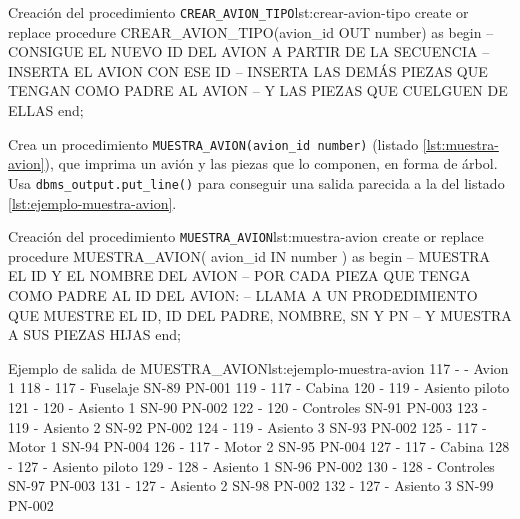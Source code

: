 \begin{homeworkProblem}
  \begin{listadosql}{Creación del procedimiento \texttt{CREAR\_AVION\_TIPO}}{lst:crear-avion-tipo}
create or replace procedure CREAR_AVION_TIPO(avion_id OUT number)
as 
begin
  -- CONSIGUE EL NUEVO ID DEL AVION A PARTIR DE LA SECUENCIA
  -- INSERTA EL AVION CON ESE ID
  -- INSERTA LAS DEMÁS PIEZAS QUE TENGAN COMO PADRE AL AVION
  --   Y LAS PIEZAS QUE CUELGUEN DE ELLAS
end;
\end{listadosql}


  Crea un procedimiento \texttt{MUESTRA\_AVION(avion\_id number)} (listado \ref{lst:muestra-avion}), que imprima un avión y las piezas que lo componen, en forma de árbol. Usa \texttt{dbms\_output.put\_line()} para conseguir una salida parecida a la del listado \ref{lst:ejemplo-muestra-avion}.

\begin{listadosql}{Creación del procedimiento \texttt{MUESTRA\_AVION}}{lst:muestra-avion}
create or replace procedure MUESTRA_AVION( avion_id IN number ) 
as
begin
  -- MUESTRA EL ID Y EL NOMBRE DEL AVION
  -- POR CADA PIEZA QUE TENGA COMO PADRE AL ID DEL AVION:
  --   LLAMA A UN PRODEDIMIENTO QUE MUESTRE EL ID, ID DEL PADRE, NOMBRE, SN Y PN 
  --      Y MUESTRA A SUS PIEZAS HIJAS
end;
\end{listadosql}


\begin{listadotxt}{Ejemplo de salida de MUESTRA\_AVION}{lst:ejemplo-muestra-avion}
117 -  - Avion 1  
    118 - 117 - Fuselaje SN-89 PN-001
    119 - 117 - Cabina  
        120 - 119 - Asiento piloto  
            121 - 120 - Asiento 1 SN-90 PN-002
            122 - 120 - Controles SN-91 PN-003
        123 - 119 - Asiento 2 SN-92 PN-002
        124 - 119 - Asiento 3 SN-93 PN-002
    125 - 117 - Motor 1 SN-94 PN-004
    126 - 117 - Motor 2 SN-95 PN-004
    127 - 117 - Cabina  
        128 - 127 - Asiento piloto  
            129 - 128 - Asiento 1 SN-96 PN-002
            130 - 128 - Controles SN-97 PN-003
        131 - 127 - Asiento 2 SN-98 PN-002
        132 - 127 - Asiento 3 SN-99 PN-002

\end{listadotxt}
  
\end{homeworkProblem}

